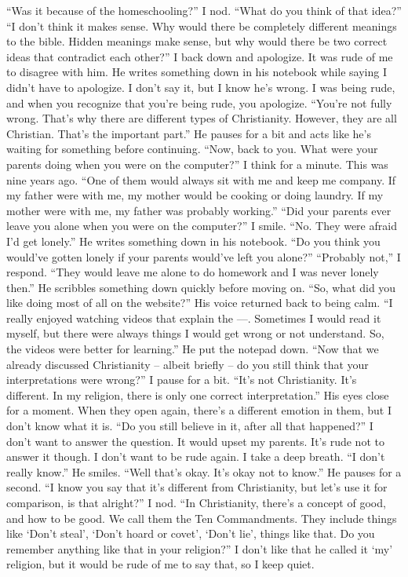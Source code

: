 \documentclass[a4paper, 12pt]{book}
\newcommand\tab[1][1cm]{\hspace*{#1}}
\newcommand\nextline{\newline\tab}
\begin{document}
\nextline
``Was it because of the homeschooling?'' I nod.
\nextline
``What do you think of that idea?''
\nextline
``I don't think it makes sense. Why would there be completely different meanings to the bible. Hidden meanings make sense, but why would there be two correct ideas that contradict each other?'' I back down and apologize. It was rude of me to disagree with him. He writes something down in his notebook while saying I didn't have to apologize. I don't say it, but I know he's wrong. I was being rude, and when you recognize that you're being rude, you apologize. 
\nextline
``You're not fully wrong. That's why there are different types of Christianity. However, they are all Christian. That's the important part.'' He pauses for a bit and acts like he's waiting for something before continuing. ``Now, back to you. What were your parents doing when you were on the computer?''
\nextline
I think for a minute. This was nine years ago. ``One of them would always sit with me and keep me company. If my father were with me, my mother would be cooking or doing laundry. If my mother were with me, my father was probably working.''
\nextline
``Did your parents ever leave you alone when you were on the computer?''
\nextline
I smile. ``No. They were afraid I'd get lonely.'' He writes something down in his notebook.
\nextline
``Do you think you would've gotten lonely if your parents would've left you alone?''
\nextline
``Probably not,'' I respond. ``They would leave me alone to do homework and I was never lonely then.'' 
\nextline
He scribbles something down quickly before moving on.  ``So, what did you like doing most of all on the website?'' His voice returned back to being calm.
\nextline
``I really enjoyed watching videos that explain the ---. Sometimes I would read it myself, but there were always things I would get wrong or not understand. So, the videos were better for learning.''
\nextline
He put the notepad down. ``Now that we already discussed Christianity – albeit briefly – do you still think that your interpretations were wrong?''
\nextline
I pause for a bit. ``It's not Christianity. It's different. In my religion, there is only one correct interpretation.''
\nextline
His eyes close for a moment. When they open again, there's a different emotion in them, but I don't know what it is. ``Do you still believe in it, after all that happened?'' 
\nextline
I don't want to answer the question. It would upset my parents. It's rude not to answer it though. I don't want to be rude again. I take a deep breath. ``I don't really know.''
\nextline
He smiles. ``Well that's okay. It's okay not to know.'' He pauses for a second. ``I know you say that it's different from Christianity, but let's use it for comparison, is that alright?'' I nod. ``In Christianity, there's a concept of good, and how to be good. We call them the Ten Commandments. They include things like `Don't steal', `Don't hoard or covet', `Don't lie', things like that. Do you remember anything like that in your religion?'' I don't like that he called it `my' religion, but it would be rude of me to say that, so I keep quiet.
\end{document}
